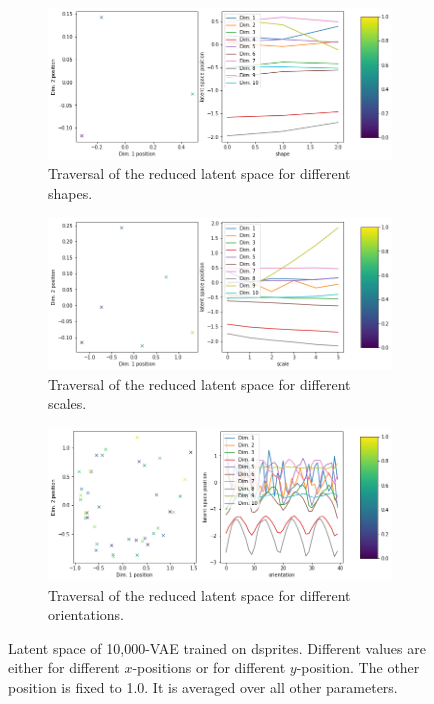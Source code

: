 \documentclass[11pt,a4paper]{article}
\begin{document}
\begin{figure}[H]
\centering
\begin{subfigure}{.48\textwidth}
\includegraphics[width=\textwidth]{images/latent_space_traversals/vae_10000_dsprites_latent_space_values_shape.png}
\caption{Traversal of the reduced latent space for different shapes.}
\end{subfigure}
\begin{subfigure}{.48\textwidth}
\includegraphics[width=\textwidth]{images/latent_space_traversals/vae_10000_dsprites_latent_space_values_scale.png}
\caption{Traversal of the reduced latent space for different scales.}
\end{subfigure}
\begin{subfigure}{.48\textwidth}
\includegraphics[width=\textwidth]{images/latent_space_traversals/vae_10000_dsprites_latent_space_values_orientation.png}
\caption{Traversal of the reduced latent space for different orientations.}
\end{subfigure}
\caption[\ac{VAE} on dsprites: Latent Space Values]{Latent space of 10,000-\ac{VAE} trained on dsprites. Different values are either for different $x$-positions or for different $y$-position. The other position is fixed to 1.0. It is averaged over all other parameters.}
\label{fig:vae_dsprites_10000_latent_space_position}
\end{figure}
\end{document}
